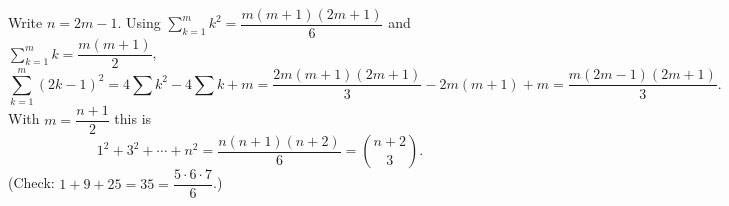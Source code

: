 Write $n=2m-1$. Using $\displaystyle\sum_{k=1}^mk^2=\dfrac{m(m+1)(2m+1)}{6}$ and $\displaystyle\sum_{k=1}^mk=\dfrac{m(m+1)}{2}$,
\[\sum_{k=1}^m(2k-1)^2=4\sum k^2-4\sum k+m=\dfrac{2m(m+1)(2m+1)}{3}-2m(m+1)+m=\dfrac{m(2m-1)(2m+1)}{3}.\]
With $m=\dfrac{n+1}{2}$ this is
\[1^2+3^2+\cdots+n^2=\boxed{\dfrac{n(n+1)(n+2)}{6}}=\binom{n+2}{3}.\]
(Check: $1+9+25=35=\dfrac{5\cdot6\cdot7}{6}$.)
